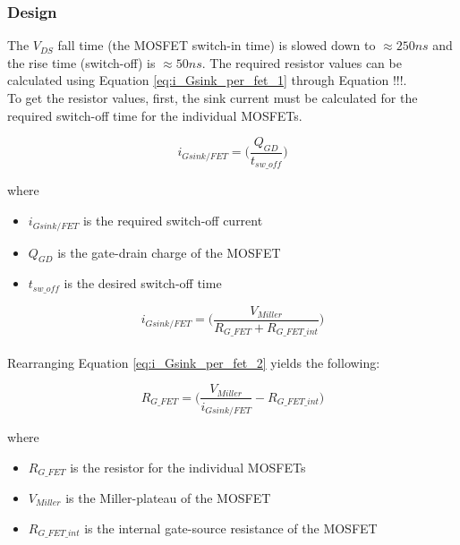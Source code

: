 \subsubsection{Design}

The $V_{DS}$ fall time (the MOSFET switch-in time) is slowed down to $\approx 250ns$ and the rise time (switch-off) is $\approx 50ns$. The required resistor values can be calculated using Equation \ref{eq:i_Gsink_per_fet_1} through Equation !!!. \\

To get the resistor values, first, the sink current must be calculated for the required switch-off time for the individual MOSFETs.

    \begin{equation}
        i_{Gsink/FET} = \bigg( \frac{Q_{GD}}{t_{sw{\_}off}} \bigg)
        \label{eq:i_Gsink_per_fet_1}
    \end{equation}
    
    where
    
    \begin{itemize}
        \item $i_{Gsink/FET}$ is the required switch-off current
        \item $Q_{GD}$ is the gate-drain charge of the MOSFET
        \item $t_{sw{\_}off}$ is the desired switch-off time
    \end{itemize}
    
    \begin{equation}
        i_{Gsink/FET} = \bigg( \frac{V_{Miller}}{R_{G{\_}FET} + R_{G{\_}FET{\_}int}} \bigg)
        \label{eq:i_Gsink_per_fet_2}
    \end{equation} \\
    
    Rearranging Equation \ref{eq:i_Gsink_per_fet_2} yields the following:
    
    \begin{equation}
        R_{G{\_}FET} = \bigg( \frac{V_{Miller}}{i_{Gsink/FET}} - R_{G{\_}FET{\_}int} \bigg)
        \label{eq:i_Gsink_per_fet_2}
    \end{equation}
    
    where
    
    \begin{itemize}
        \item $R_{G{\_}FET}$ is the resistor for the individual MOSFETs
        \item $V_{Miller}$ is the Miller-plateau of the MOSFET
        \item $R_{G{\_}FET{\_}int}$ is the internal gate-source resistance of the MOSFET
    \end{itemize}
    
